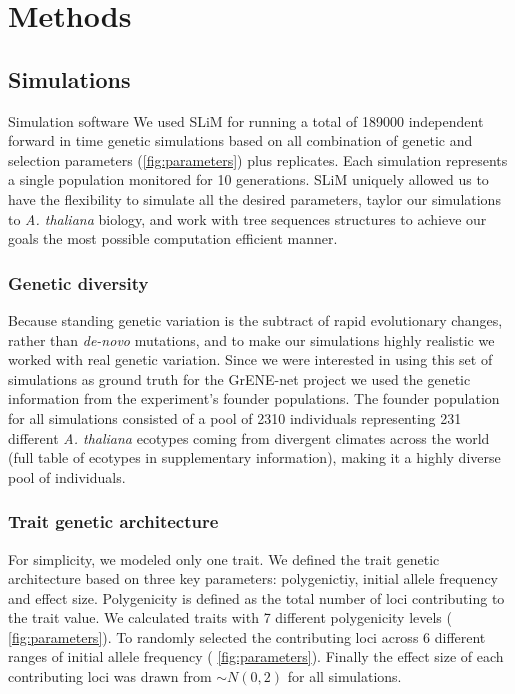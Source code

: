 \documentclass{article}
\begin{document}
\section{Methods}
\subsection{Simulations}

Simulation software
We used SLiM \citep{Haller2019-oj} for running a total of 189000 independent forward in time genetic simulations based on all combination of genetic and selection parameters (\ref{fig:parameters}) plus replicates. Each simulation represents a single population monitored for 10 generations. SLiM uniquely allowed us to have the flexibility to simulate all the desired parameters, taylor our simulations to \textit{A. thaliana} biology, and work with tree sequences structures to achieve our goals the most possible computation efficient manner.

\subsubsection{Genetic diversity}
Because standing genetic variation is the subtract of rapid evolutionary changes, rather than \textit{de-novo} mutations, and to make our simulations highly realistic we worked with real genetic variation. Since we were interested in using this set of simulations as ground truth for the GrENE-net project we used the genetic information from the experiment's founder populations. The founder population for all simulations consisted of a pool of 2310 individuals representing 231 different \textit{A. thaliana} ecotypes coming from divergent climates across the world (full table of ecotypes in supplementary information), making it a highly diverse pool of individuals. 

\subsubsection{Trait genetic architecture}
For simplicity, we modeled only one trait. We defined the trait genetic architecture based on three key parameters: polygenictiy, initial allele frequency and effect size. Polygenicity is defined as the total number of loci contributing to the trait value. We calculated traits with 7 different polygenicity levels ( \ref{fig:parameters}). To randomly selected the contributing loci across 6 different ranges of initial allele frequency ( \ref{fig:parameters}). Finally the effect size of each contributing loci was drawn from \( \sim N(0, 2) \) for all simulations.
\end{document}
